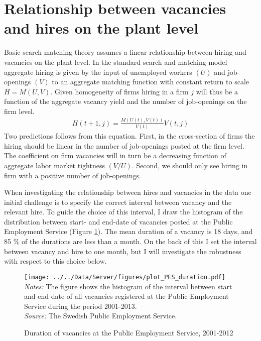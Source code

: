 \section{Relationship between vacancies and hires on the plant level}
\label{sec:basic_rel}

Basic search-matching theory assumes a linear relationship between hiring and vacancies on the plant level. In the standard search and matching model aggregate hiring is given by the input of unemployed workers $(U)$ and job-openings $(V)$ to an aggregate matching function with constant return to scale $H=M(U,V)$. Given  homogeneity of firms hiring in a firm $j$ will thus be a function of the aggregate vacancy yield and the number of job-openings on the firm level.
\begin{align}
H(t+1, j)=\frac{M(U(t),V(t))}{V(t)} V(t,j)
\label{eq:ht+1}
\end{align}
Two predictions follows from this equation. First, in the cross-section of firms the hiring should be linear in the number of job-openings posted at the firm level. The coefficient on firm vacancies will in turn be a decreasing function of aggregate labor market tightness $(V/U)$. Second, we should only see hiring in firm with a positive number of job-openings. 

When investigating the relationship between hires and vacancies in the data one initial challenge is to specify the correct interval between vacancy and the relevant hire. To guide the choice of this interval, I draw the histogram of the distribution between start- and end-date of vacancies posted at the Public Employment Service (Figure \ref{fig:PES_duration}). The mean duration of a vacancy is 18 days, and 85 \% of the durations are less than a month. On the back of this I set the interval between vacancy and hire to one month, but I will investigate the robustness with respect to this choice below. 

\begin{figure}[h]
\centering
\caption{Duration of vacancies at the Public Employment Service, 2001-2012}
\texttt{[image: ../../Data/Server/figures/plot\_PES\_duration.pdf]}
\flushleft
\footnotesize{\emph{Notes:} The figure shows the histogram of the interval between start and end date of all vacancies registered at the Public Employment Service during the period 2001-2013.} \\
\footnotesize{\emph{Source:} The Swedish Public Employment Service.}
\label{fig:PES_duration}
\end{figure}


